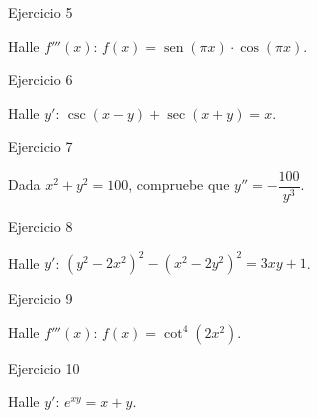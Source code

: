 \documentclass[aspectratio=169]{beamer}
\begin{document}
\begin{frame}{Ejercicio 5}
  \begin{mwejercicio}
    Halle $f'''(x)$: $f(x) = \operatorname{sen}(\pi x)\cdot\cos(\pi x)$.
  \end{mwejercicio}
\end{frame}

\begin{frame}{Ejercicio 6}
  \begin{mwejercicio}
    Halle $y'$: $\csc(x-y) + \sec(x+y) = x$.
  \end{mwejercicio}
\end{frame}

\begin{frame}{Ejercicio 7}
  \begin{mwejercicio}
    Dada $x^2 + y^2 = 100$, compruebe que $y'' = -\dfrac{100}{y^3}$.
  \end{mwejercicio}
\end{frame}

\begin{frame}{Ejercicio 8}
  \begin{mwejercicio}
    Halle $y'$: $(y^2 - 2x^2)^2 - (x^2 - 2y^2)^2 = 3xy + 1$.
  \end{mwejercicio}
\end{frame}

\begin{frame}{Ejercicio 9}
  \begin{mwejercicio}
    Halle $f'''(x)$: $f(x) = \cot^4(2x^2)$.
  \end{mwejercicio}
\end{frame}

\begin{frame}{Ejercicio 10}
  \begin{mwejercicio}
    Halle $y'$: $e^{xy} = x + y$.
  \end{mwejercicio}
\end{frame}
\end{document}
